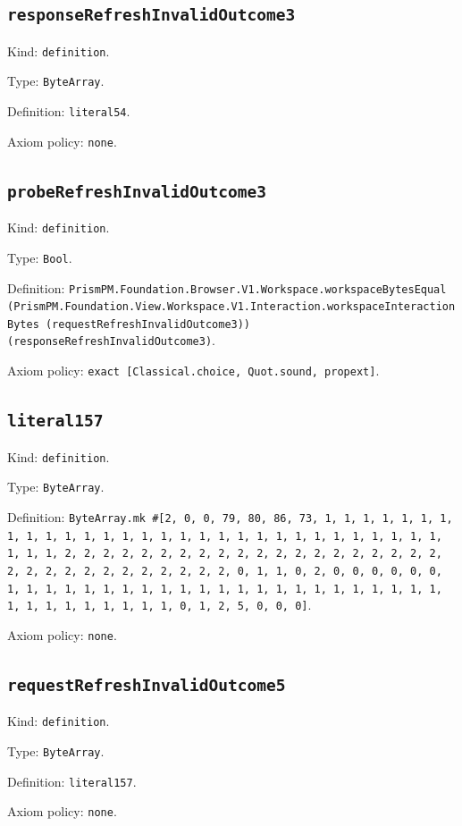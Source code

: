 \documentclass[11pt]{article}
\begin{document}
\subsection*{\texttt{responseRefreshInvalidOutcome3}}
\noindent Kind: \texttt{definition}.\par
\noindent Type: \texttt{ByteArray}.\par
\noindent Definition: \texttt{literal54}.\par
\noindent Axiom policy: \texttt{none}.\par
\subsection*{\texttt{probeRefreshInvalidOutcome3}}
\noindent Kind: \texttt{definition}.\par
\noindent Type: \texttt{Bool}.\par
\noindent Definition: \texttt{PrismPM.Foundation.Browser.V1.Workspace.workspaceBytesEqual (PrismPM.Foundation.View.Workspace.V1.Interaction.workspaceInteractionBytes (requestRefreshInvalidOutcome3)) (responseRefreshInvalidOutcome3)}.\par
\noindent Axiom policy: \texttt{exact [Classical.choice, Quot.sound, propext]}.\par
\subsection*{\texttt{literal157}}
\noindent Kind: \texttt{definition}.\par
\noindent Type: \texttt{ByteArray}.\par
\noindent Definition: \texttt{ByteArray.mk \#[2, 0, 0, 79, 80, 86, 73, 1, 1, 1, 1, 1, 1, 1, 1, 1, 1, 1, 1, 1, 1, 1, 1, 1, 1, 1, 1, 1, 1, 1, 1, 1, 1, 1, 1, 1, 1, 1, 1, 1, 2, 2, 2, 2, 2, 2, 2, 2, 2, 2, 2, 2, 2, 2, 2, 2, 2, 2, 2, 2, 2, 2, 2, 2, 2, 2, 2, 2, 2, 2, 2, 2, 0, 1, 1, 0, 2, 0, 0, 0, 0, 0, 0, 1, 1, 1, 1, 1, 1, 1, 1, 1, 1, 1, 1, 1, 1, 1, 1, 1, 1, 1, 1, 1, 1, 1, 1, 1, 1, 1, 1, 1, 1, 1, 1, 0, 1, 2, 5, 0, 0, 0]}.\par
\noindent Axiom policy: \texttt{none}.\par
\subsection*{\texttt{requestRefreshInvalidOutcome5}}
\noindent Kind: \texttt{definition}.\par
\noindent Type: \texttt{ByteArray}.\par
\noindent Definition: \texttt{literal157}.\par
\noindent Axiom policy: \texttt{none}.\par
\end{document}

